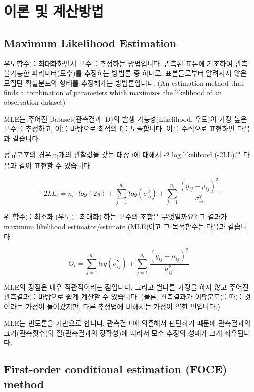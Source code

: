 \documentclass[
  12pt,
]{krantz}
\begin{document}
\hypertarget{method}{%
\chapter{이론 및 계산방법}\label{method}}

\hypertarget{maximum-likelihood-estimation}{%
\section{Maximum Likelihood Estimation}\label{maximum-likelihood-estimation}}

우도함수를 최대화하면서 모수를 추정하는 방법입니다.
관측된 표본에 기초하여 관측 불가능한 파라미터(모수)를 추정하는 방법론 중 하나로, 표본들로부터 알려지지 않은 모집단 확률분포의 형태를 추정해가는 방법론입니다. (An estimation method that finds a combination of parameters which maximizes the likelihood of an observation dataset)

MLE는 주어진 Dataset(관측결과, D)의 발생 가능성(Likelihood, 우도)이 가장 높은 모수를 추정하고, 이를 바탕으로 최적의 f를 도출합니다. 이를 수식으로 표현하면 다음과 같습니다.

정규분포의 경우 n\textsubscript{i}개의 관찰값을 갖는 대상 i에 대해서 -2 log likelihood (-2LL)은 다음과 같이 표현할 수 있습니다.

\[
-2LL_i = n_i \cdot log(2\pi) + \sum\limits_{j=1}^{n_i} log(\sigma_{ij}^2) + \sum\limits_{j=1}^{n_i} \frac{(y_{ij} - \mu_{ij})^2}{\sigma_{ij}^2}
\]

위 함수를 최소화 (우도를 최대화) 하는 모수의 조합은 무엇일까요? 그 결과가 maximum likelihood estimator/estimate (MLE)이고 그 목적함수는 다음과 같습니다.

\[
O_i = \sum\limits_{j=1}^{n_i} log(\sigma_{ij}^2) + \sum\limits_{j=1}^{n_i} \frac{(y_{ij} - \mu_{ij})^2}{\sigma_{ij}^2}
\]

MLE의 장점은 매우 직관적이라는 점입니다. 그리고 별다른 가정을 하지 않고 주어진 관측결과를 바탕으로 쉽계 계산할 수 있습니다. (물론, 관측결과가 이항분포를 따를 것이라는 가정이 들어갔지만, 다른 추정법에 비해서는 가정이 약한 편입니다.)

MLE는 빈도론을 기반으로 합니다. 관측결과에 의존해서 판단하기 때문에 관측결과의 크기(관측횟수)와 질(관측결과의 정확성)에 따라서 모수 추정의 성패가 크게 좌우됩니다.

\hypertarget{first-order-conditional-estimation-foce-method}{%
\section{First-order conditional estimation (FOCE) method}\label{first-order-conditional-estimation-foce-method}}
\end{document}
